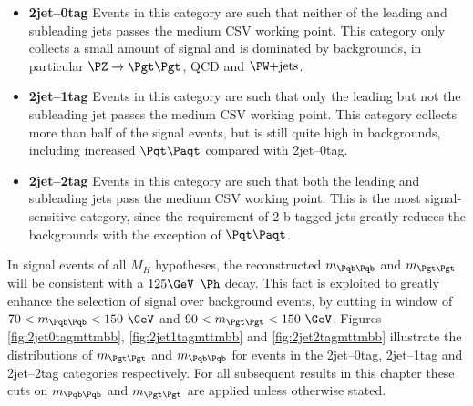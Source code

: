 \begin{itemize}
\item \textbf{2jet--0tag} 
Events in this category are such that neither of the leading and subleading jets
passes the medium \ac{CSV} working point. This category only collects a small amount
of signal and is dominated by backgrounds, in particular $\ZToTauTau$, QCD and
$\WJets$.
\item \textbf{2jet--1tag} 
Events in this category are such that only the leading but not the subleading jet
passes the medium \ac{CSV} working point. This category collects more than half of
the signal events, but is still quite high in backgrounds, including increased
$\ttbar$ compared with 2jet--0tag.
\item \textbf{2jet--2tag} 
Events in this category are such that both the leading and subleading jets
pass the medium \ac{CSV} working point. This is the most signal-sensitive category,
since the requirement of 2 b-tagged jets greatly reduces the backgrounds with
the exception of $\ttbar$.  
\end{itemize}

In signal events of all $M_{H}$ hypotheses, the reconstructed $m_{\Pqb\Pqb}$ and
$m_{\Pgt\Pgt}$ will be consistent with a $125 \GeV$ $\Ph$ decay. This fact is exploited to greatly
enhance the selection of signal over background events, by cutting in window of
$70 < m_{\Pqb\Pqb} < 150~\GeV$ and $90 < m_{\Pgt\Pgt} < 150~\GeV$.
Figures \ref{fig:2jet0tagmttmbb}, \ref{fig:2jet1tagmttmbb} and
\ref{fig:2jet2tagmttmbb} illustrate the distributions of $m_{\Pgt\Pgt}$ and
$m_{\Pqb\Pqb}$ for events in the 2jet--0tag, 2jet--1tag and 2jet--2tag
categories respectively. For all subsequent results in this chapter these cuts
on $m_{\Pqb\Pqb}$ and $m_{\Pgt\Pgt}$ are applied unless otherwise stated. 

